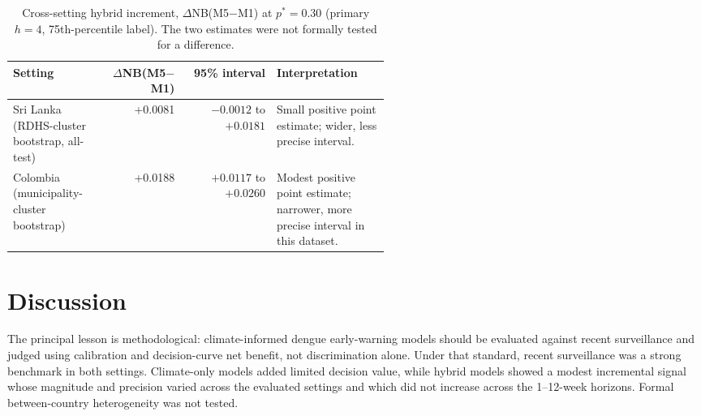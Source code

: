 \documentclass[11pt,a4paper]{article}
\begin{document}
\begin{table}[htbp]
\centering
\caption{Cross-setting hybrid increment, $\Delta$NB(M5$-$M1) at $p^*=0.30$ (primary $h=4$, 75th-percentile label). The two estimates were not formally tested for a difference.}
\label{tab:crosssetting}
\small
\begin{tabular}{p{0.24\linewidth}rrp{0.30\linewidth}}
\toprule
Setting & $\Delta$NB(M5$-$M1) & 95\% interval & Interpretation \\
\midrule
Sri Lanka (RDHS-cluster bootstrap, all-test) & +0.0081 & $-0.0012$ to $+0.0181$ & Small positive point estimate; wider, less precise interval. \\
Colombia (municipality-cluster bootstrap) & +0.0188 & $+0.0117$ to $+0.0260$ & Modest positive point estimate; narrower, more precise interval in this dataset. \\
\bottomrule
\end{tabular}
\end{table}

\section{Discussion}

The principal lesson is methodological: climate-informed dengue early-warning models should be evaluated against recent surveillance and judged using calibration and decision-curve net benefit, not discrimination alone. Under that standard, recent surveillance was a strong benchmark in both settings. Climate-only models added limited decision value, while hybrid models showed a modest incremental signal whose magnitude and precision varied across the evaluated settings and which did not increase across the 1--12-week horizons. Formal between-country heterogeneity was not tested.
\end{document}
